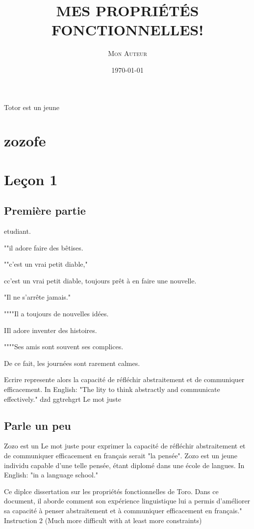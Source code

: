 \documentclass{article}
\title{\MakeUppercase{\textsc{Mes Propriétés Fonctionnelles!}}}
\author{\textsc{Mon Auteur}}
\date{\today}
\begin{document}
\maketitle

Totor est un jeune

\section{zozofe}

\section{Leçon 1} \subsection{Première partie}

etudiant.

""il adore faire des bêtises.

""c'est un vrai petit diable,"

cc'est un vrai petit diable, toujours prêt à en faire une nouvelle.

"Il ne s'arrête jamais."

""""Il a toujours de nouvelles idées.

IIl adore inventer des histoires.

""""Ses amis sont souvent ses complices.

De ce fait, les journées sont rarement calmes.



Ecrire represente alors la capacité de réfléchir abstraitement et de communiquer efficacement. In English: "The lity to think abstractly and communicate effectively." dzd ggtrehgrt
Le mot juste	

\subsection{Parle un peu}

Zozo est un Le mot juste pour exprimer la capacité de réfléchir abstraitement et de communiquer efficacement en français serait "la pensée". Zozo est un jeune individu capable d'une telle pensée, étant diplomé dans une école de langues. In English: "in a language school."

Ce diplce dissertation sur les propriétés fonctionnelles de Toro. Dans ce document, il aborde comment son expérience linguistique lui a permis d'améliorer sa capacité à penser abstraitement et à communiquer efficacement en français." Instruction 2 (Much more difficult with at least more constraints)
\end{document}

